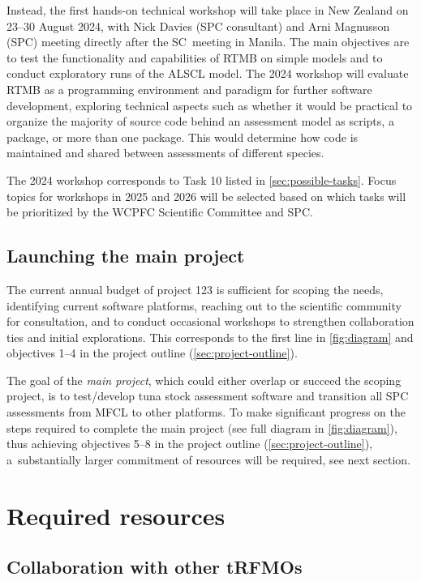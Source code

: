 \documentclass{SCreport}
\begin{document}
Instead, the first hands-on technical workshop will take place in New Zealand on
23--30 August 2024, with Nick Davies (SPC consultant) and Arni Magnusson (SPC)
meeting directly after the SC~meeting in Manila. The main objectives are to test
the functionality and capabilities of RTMB on simple models and to conduct
exploratory runs of the ALSCL model. The 2024 workshop will evaluate RTMB as a
programming environment and paradigm for further software development, exploring
technical aspects such as whether it would be practical to organize the majority
of source code behind an assessment model as scripts, a package, or more than
one package. This would determine how code is maintained and shared between
assessments of different species.

\newpage

The 2024 workshop corresponds to Task 10 listed in \autoref{sec:possible-tasks}.
Focus topics for workshops in 2025 and 2026 will be selected based on which
tasks will be prioritized by the WCPFC Scientific Committee and SPC.

\subsection{Launching the main project}

The current annual budget of project 123 is sufficient for scoping the needs,
identifying current software platforms, reaching out to the scientific community
for consultation, and to conduct occasional workshops to strengthen
collaboration ties and initial explorations. This corresponds to the first line
in \autoref{fig:diagram} and objectives 1--4 in the project outline
(\autoref{sec:project-outline}).

The goal of the \emph{main project}, which could either overlap or succeed the
scoping project, is to test/develop tuna stock assessment software and
transition all SPC assessments from MFCL to other platforms. To make significant
progress on the steps required to complete the main project (see full diagram in
\autoref{fig:diagram}), thus achieving objectives 5--8 in the project outline
(\autoref{sec:project-outline}), a~substantially larger commitment of resources
will be required, see next section.

\section{Required resources}

\subsection{Collaboration with other tRFMOs}
\end{document}
